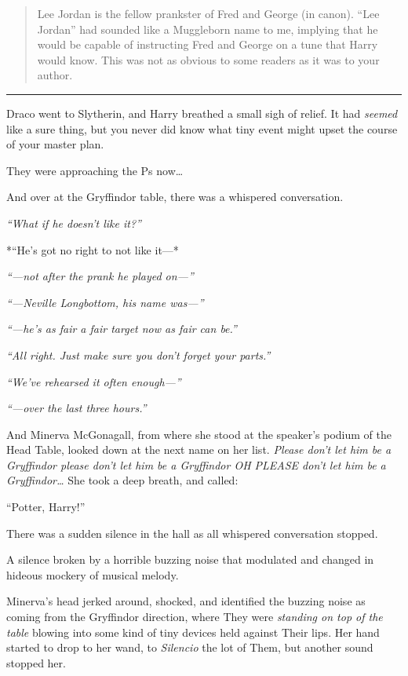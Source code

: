 \begin{quote}
Lee Jordan is the fellow prankster of Fred and George (in canon). ``Lee
Jordan'' had sounded like a Muggleborn name to me, implying that he
would be capable of instructing Fred and George on a tune that Harry
would know. This was not as obvious to some readers as it was to your
author.
\end{quote}

\begin{center}\rule{3in}{0.4pt}\end{center}

Draco went to Slytherin, and Harry breathed a small sigh of relief. It
had \emph{seemed} like a sure thing, but you never did know what tiny
event might upset the course of your master plan.

They were approaching the Ps now\ldots{}

And over at the Gryffindor table, there was a whispered conversation.

\emph{``What if he doesn't like it?''}

*``He's got no right to not like it---*

\emph{``---not after the prank he played on---''}

\emph{``---Neville Longbottom, his name was---''}

\emph{``---he's as fair a fair target now as fair can be.''}

\emph{``All right. Just make sure you don't forget your parts.''}

\emph{``We've rehearsed it often enough---''}

\emph{``---over the last three hours.''}

And Minerva McGonagall, from where she stood at the speaker's podium of
the Head Table, looked down at the next name on her list. \emph{Please
don't let him be a Gryffindor please don't let him be a Gryffindor OH
PLEASE don't let him be a Gryffindor\ldots{}} She took a deep breath,
and called:

``Potter, Harry!''

There was a sudden silence in the hall as all whispered conversation
stopped.

A silence broken by a horrible buzzing noise that modulated and changed
in hideous mockery of musical melody.

Minerva's head jerked around, shocked, and identified the buzzing noise
as coming from the Gryffindor direction, where They were \emph{standing
on top of the table} blowing into some kind of tiny devices held against
Their lips. Her hand started to drop to her wand, to \emph{Silencio} the
lot of Them, but another sound stopped her.

